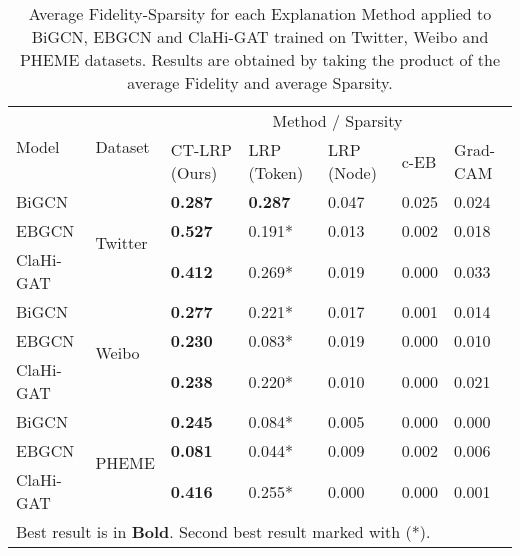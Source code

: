 \begin{table}[t]
\caption{Average Fidelity-Sparsity for each Explanation Method applied to BiGCN, EBGCN and ClaHi-GAT trained on Twitter, Weibo and PHEME datasets. Results are obtained by taking the product of the average Fidelity and average Sparsity.}
\centering
\begin{tabularx}{\columnwidth}{|X|X|X|X|X|X|X|}
\hline
\multirow{2}{*}{Model} & \multirow{2}{*}{Dataset} & \multicolumn{5}{c|}{Method / Sparsity}                            \\ \cline{3-7} 
                       &                          & CT-LRP (Ours)  & LRP (Token)   & LRP (Node)   & c-EB  & Grad-CAM \\ \hline
BiGCN                  & \multirow{3}{*}{Twitter} & \textbf{0.287}         & \textbf{0.287}       & 0.047 & 0.025 & 0.024    \\ \cline{1-1} \cline{3-7} 
EBGCN                  &                          & \textbf{0.527} & 0.191*               & 0.013 & 0.002 & 0.018    \\ \cline{1-1} \cline{3-7} 
ClaHi-GAT              &                          & \textbf{0.412} & 0.269*               & 0.019 & 0.000 & 0.033    \\ \hline
BiGCN                  & \multirow{3}{*}{Weibo}   & \textbf{0.277} & 0.221*               & 0.017 & 0.001 & 0.014    \\ \cline{1-1} \cline{3-7} 
EBGCN                  &                          & \textbf{0.230} & 0.083*               & 0.019 & 0.000 & 0.010    \\ \cline{1-1} \cline{3-7} 
ClaHi-GAT              &                          & \textbf{0.238} & 0.220*               & 0.010 & 0.000 & 0.021    \\ \hline
BiGCN                  & \multirow{3}{*}{PHEME}   & \textbf{0.245} & 0.084*               & 0.005 & 0.000 & 0.000    \\ \cline{1-1} \cline{3-7} 
EBGCN                  &                          & \textbf{0.081} & 0.044*               & 0.009 & 0.002 & 0.006    \\ \cline{1-1} \cline{3-7} 
ClaHi-GAT              &                          & \textbf{0.416}         & {0.255*}       & 0.000 & 0.000 & 0.001    \\ \hline
\multicolumn{7}{l}{\footnotesize{Best result is in \textbf{Bold}. Second best result marked with (*).}} \\
\end{tabularx}
\label{tab:fidelity-sparsity}
\end{table}


